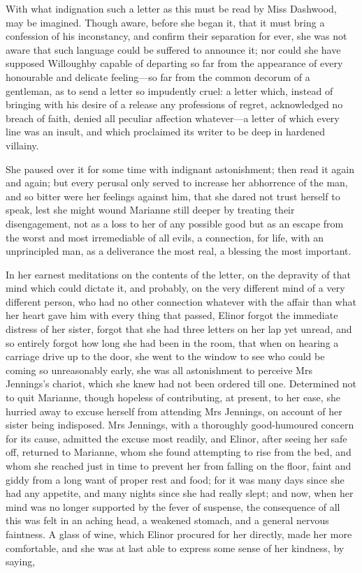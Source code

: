 With what indignation such a letter as this must be read by Miss Dashwood, may be imagined. Though aware, before she began it, that it must bring a confession of his inconstancy, and confirm their separation for ever, she was not aware that such language could be suffered to announce it; nor could she have supposed Willoughby capable of departing so far from the appearance of every honourable and delicate feeling—so far from the common decorum of a gentleman, as to send a letter so impudently cruel: a letter which, instead of bringing with his desire of a release any professions of regret, acknowledged no breach of faith, denied all peculiar affection whatever—a letter of which every line was an insult, and which proclaimed its writer to be deep in hardened villainy.

She paused over it for some time with indignant astonishment; then read it again and again; but every perusal only served to increase her abhorrence of the man, and so bitter were her feelings against him, that she dared not trust herself to speak, lest she might wound Marianne still deeper by treating their disengagement, not as a loss to her of any possible good but as an escape from the worst and most irremediable of all evils, a connection, for life, with an unprincipled man, as a deliverance the most real, a blessing the most important.

In her earnest meditations on the contents of the letter, on the depravity of that mind which could dictate it, and probably, on the very different mind of a very different person, who had no other connection whatever with the affair than what her heart gave him with every thing that passed, Elinor forgot the immediate distress of her sister, forgot that she had three letters on her lap yet unread, and so entirely forgot how long she had been in the room, that when on hearing a carriage drive up to the door, she went to the window to see who could be coming so unreasonably early, she was all astonishment to perceive Mrs Jennings's chariot, which she knew had not been ordered till one. Determined not to quit Marianne, though hopeless of contributing, at present, to her ease, she hurried away to excuse herself from attending Mrs Jennings, on account of her sister being indisposed. Mrs Jennings, with a thoroughly good-humoured concern for its cause, admitted the excuse most readily, and Elinor, after seeing her safe off, returned to Marianne, whom she found attempting to rise from the bed, and whom she reached just in time to prevent her from falling on the floor, faint and giddy from a long want of proper rest and food; for it was many days since she had any appetite, and many nights since she had really slept; and now, when her mind was no longer supported by the fever of suspense, the consequence of all this was felt in an aching head, a weakened stomach, and a general nervous faintness. A glass of wine, which Elinor procured for her directly, made her more comfortable, and she was at last able to express some sense of her kindness, by saying,

